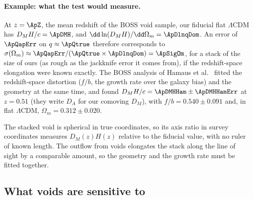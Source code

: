 \paragraph{Example: what the test would measure.}
At $z=\ApZ$, the mean redshift of the BOSS void sample, our fiducial flat
$\Lambda$CDM has $D_MH/c=\ApDMH$, and $\dd\ln(D_MH)/\dd\Omega_m=\ApDlnqDom$. An
error of $\ApQapErr$ on $q\approx\ApQtrue$ therefore corresponds to
$\sigma(\Omega_m)\approx\ApQapErr/(\ApQtrue\times\ApDlnqDom)=\ApSigOm$, for a stack
of the size of ours (as rough as the jackknife error it comes from), if the redshift-space elongation were known exactly. The BOSS
analysis of Hamaus et al.\ \cite{Hamaus2020} fitted the redshift-space distortion
($f/b$, the growth rate over the galaxy bias) and the geometry at the same time, and
found $D_MH/c=\ApDMHHam\pm\ApDMHHamErr$ at $z=0.51$ (they write $D_A$ for our
comoving $D_M$), with $f/b=0.540\pm0.091$ and, in flat $\Lambda$CDM,
$\Omega_m=0.312\pm0.020$.

\begin{keyidea}
The stacked void is spherical in true coordinates, so its axis ratio in survey
coordinates measures $D_M(z)H(z)$ relative to the fiducial value, with no ruler of
known length. The outflow from voids elongates the stack along the line of sight by
a comparable amount, so the geometry and the growth rate must be fitted together.
\end{keyidea}

\subsection{What voids are sensitive to}
\label{11b:sec:void-sensitivity}


